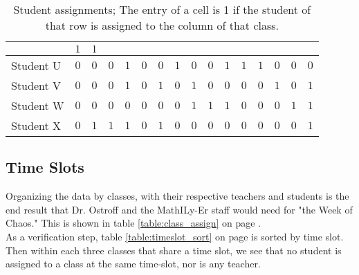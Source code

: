 \documentclass[11pt]{article}
\begin{document}
\begin{table}[h]
\begin{tabular}{|a||l|l|l|l|l|l|l|l|l|l|l|l|l|l|l|}
& $1$ & $1$ \\ \hline
Student U & $0$ & $0$ & $0$ & $1$ & $0$ & $0$
& $1$ & $0$ & $0$ & $1$ & $1$ & $1$ & $0$
& $0$ & $0$ \\ \hline
Student V & $0$ & $0$ & $0$ & $1$ & $0$ & $1$
& $0$ & $1$ & $0$ & $0$ & $0$ & $0$ & $1$
& $0$ & $1$ \\ \hline
Student W & $0$ & $0$ & $0$ & $0$ & $0$ & $0$
& $0$ & $1$ & $1$ & $1$ & $0$ & $0$ & $0$
& $1$ & $1$ \\ \hline
Student X & $0$ & $1$ & $1$ & $1$ & $0$ & $1$
& $0$ & $0$ & $0$ & $0$ & $0$ & $0$ & $0$
& $0$ & $1$ \\ \hline
\end{tabular}
\caption{Student assignments; The entry of a cell is 1 if the student of that row is assigned to the column of that class.}
\label{table:stud_assign}
\end{table}



\FloatBarrier	
\subsection{Time Slots}
Organizing the data by classes, with their respective teachers and students is the end result that Dr. Ostroff and the MathILy-Er staff would need for "the Week of Chaos." This is shown in table \ref{table:class_assign} on page \pageref{table:class_assign}.\\
\indent As a verification step, table \ref{table:timeslot_sort} on page \pageref{table:timeslot_sort} is sorted by time slot. Then within each three classes that share a time slot, we see that no student is assigned to a class at the same time-slot, nor is any teacher.
\end{document}
